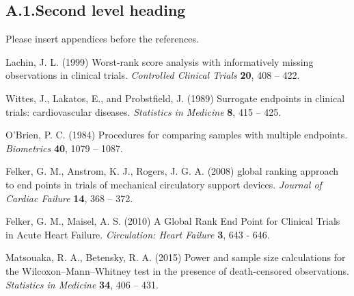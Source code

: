 \documentclass[bimj,fleqn]{w-art}\usepackage[]{graphicx}\usepackage[]{color}
\theoremstyle{plain}
\theoremstyle{definition}
\begin{document}
  \subsection*{A.1.\enspace Second level heading}

  Please insert appendices before the references.

  \begin{thebibliography}{10}

  Lachin, J. L. (1999) Worst-rank score analysis with informatively missing observations in clinical trials.  \textit{Controlled Clinical Trials} \textbf{20}, 408 – 422.

  Wittes, J., Lakatos, E., and Probstfield, J. (1989) Surrogate endpoints in clinical trials: cardiovascular diseases. \textit{Statistics in Medicine} \textbf{8}, 415 – 425.

   O'Brien, P. C. (1984) Procedures for comparing samples with multiple endpoints. \textit{Biometrics} \textbf{40}, 1079 – 1087.

 Felker, G. M., Anstrom, K. J., Rogers, J. G. A. (2008) global ranking approach to end points in trials of mechanical circulatory support devices. \textit{Journal of Cardiac Failure} \textbf{14}, 368 – 372.

 Felker, G. M., Maisel, A. S. (2010) A Global Rank End Point for Clinical Trials in Acute Heart Failure. \textit{Circulation: Heart Failure} \textbf{3}, 643 - 646.

 Matsouaka, R. A., Betensky, R. A. (2015) Power and sample size calculations for the Wilcoxon–Mann–Whitney test in the presence of death-censored observations. \textit{Statistics in Medicine} \textbf{34}, 406 – 431.



  \end{thebibliography}
  \newpage
  \phantom{aaaa}
  
\end{document}
